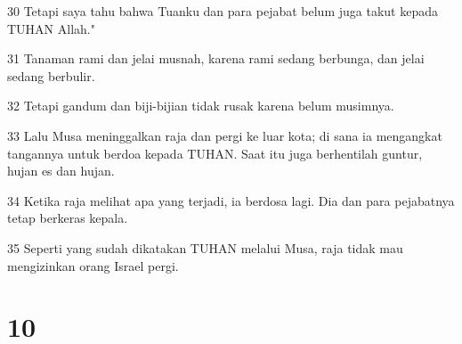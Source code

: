 \par 30 Tetapi saya tahu bahwa Tuanku dan para pejabat belum juga takut kepada TUHAN Allah."
\par 31 Tanaman rami dan jelai musnah, karena rami sedang berbunga, dan jelai sedang berbulir.
\par 32 Tetapi gandum dan biji-bijian tidak rusak karena belum musimnya.
\par 33 Lalu Musa meninggalkan raja dan pergi ke luar kota; di sana ia mengangkat tangannya untuk berdoa kepada TUHAN. Saat itu juga berhentilah guntur, hujan es dan hujan.
\par 34 Ketika raja melihat apa yang terjadi, ia berdosa lagi. Dia dan para pejabatnya tetap berkeras kepala.
\par 35 Seperti yang sudah dikatakan TUHAN melalui Musa, raja tidak mau mengizinkan orang Israel pergi.

\chapter{10}


